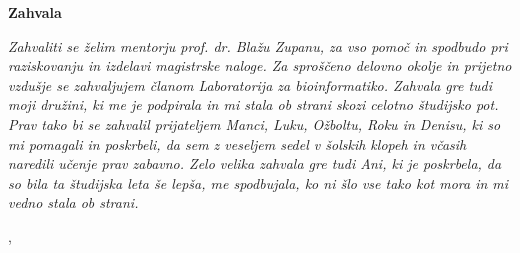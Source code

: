 \thispagestyle{empty}

\begin{center}
{\Large \textbf{\sc Zahvala}}
\end{center}
\vspace{0.5cm}

{\it\noindent
Zahvaliti se želim mentorju prof. dr. Blažu Zupanu, za vso pomoč in spodbudo pri raziskovanju in izdelavi magistrske naloge. Za sproščeno delovno okolje in prijetno vzdušje se zahvaljujem članom Laboratorija za bioinformatiko. Zahvala gre tudi moji družini, ki me je podpirala in mi stala ob strani skozi celotno študijsko pot. Prav tako bi se zahvalil prijateljem Manci, Luku, Ožboltu, Roku in Denisu, ki so mi pomagali in poskrbeli, da sem z veseljem sedel v šolskih klopeh in včasih naredili učenje prav zabavno.
Zelo velika zahvala gre tudi Ani, ki je poskrbela, da so bila ta študijska leta še lepša, me spodbujala, ko ni šlo vse tako kot mora in mi vedno stala ob strani.

\vspace{0.5cm} \hfill \tauthor, \myyear
}
